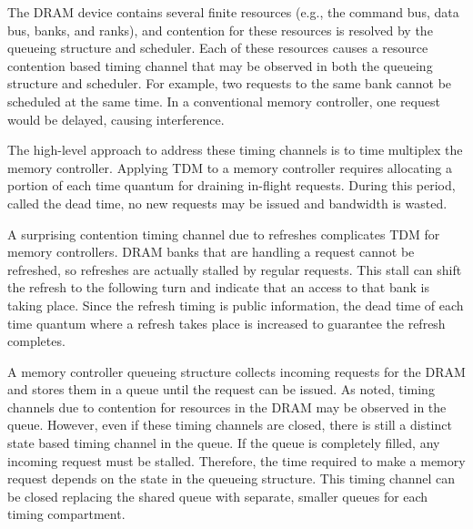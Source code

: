 The DRAM device contains several finite resources (e.g., the command bus, data
bus, banks, and ranks), and contention for these resources is resolved by the 
queueing structure and scheduler. Each of these resources causes a resource 
contention based timing channel that may be observed in both the queueing 
structure and scheduler. For example, two requests to the same bank cannot
be scheduled at the same time. In a conventional memory controller, one request 
would be delayed, causing interference.

The high-level approach to address these timing channels is to time multiplex 
the memory controller. Applying TDM to a memory controller requires allocating 
a portion of each time quantum for draining in-flight requests. During this 
period, called the dead time, no new requests may be issued and bandwidth is 
wasted. 

A surprising contention timing channel due to refreshes complicates TDM for 
memory controllers. DRAM banks that are handling a request cannot be refreshed, 
so refreshes are actually stalled by regular requests. This stall can shift the 
refresh to the following turn and indicate that an access to that bank is 
taking place. Since the refresh timing is public information, the dead time of 
each time quantum where a refresh takes place is increased to guarantee the 
refresh completes.

A memory controller queueing structure collects incoming requests for the DRAM 
and stores them in a queue until the request can be issued.  As noted, timing 
channels due to contention for resources in the
DRAM may be observed in the queue. However, even if these timing channels are 
closed, there is still a distinct state based timing channel in the queue.  If 
the queue is completely filled, any incoming request must be stalled.  
Therefore, the time required to make a memory request depends on the state in 
the queueing structure. This timing channel can be closed replacing the shared 
queue with separate, smaller queues for each timing compartment.

